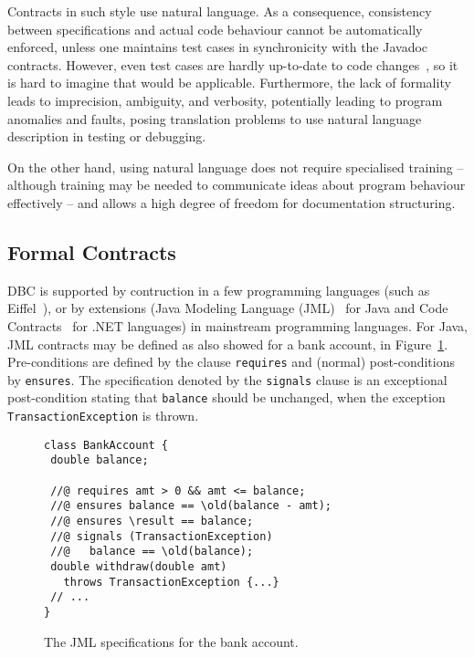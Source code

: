 Contracts in such style use natural language. As a consequence, consistency between specifications and actual code behaviour cannot be automatically enforced, unless one maintains test cases in synchronicity with the Javadoc contracts. However, even test cases are hardly up-to-date to code changes~\cite{Hao2013}, so it is hard to imagine that would be applicable. 
Furthermore, the lack of formality leads to imprecision, ambiguity, and verbosity, potentially leading to program anomalies and faults, posing translation problems to use natural language description in testing or debugging.

On the other hand, using natural language does not require specialised training -- although training may be needed to communicate
ideas about program behaviour effectively -- and allows a high degree of freedom for documentation structuring. 


\subsection{Formal Contracts}


DBC is supported by contruction in a few programming languages (such as Eiffel~\cite{eiffel}), or by extensions (Java Modeling Language (JML)~\cite{jml} for Java and Code Contracts~\cite{codeContractsPaper} for .NET languages) in mainstream programming languages.
For Java, JML contracts may be defined as also showed for a bank account, in Figure~\ref{Fig-JML-Bank}. Pre-conditions
are defined by the clause {\lstinline!requires!} and (normal) post-conditions by {\lstinline!ensures!}. The specification
denoted by the {\lstinline!signals!} clause
is an exceptional post-condition stating that {\lstinline!balance!} should be unchanged, when the exception \texttt{TransactionExcep\-tion} is thrown.

\begin{figure}
\begin{lstlisting}[basicstyle=\footnotesize\ttfamily,name=figxpi]
class BankAccount {
 double balance;

 //@ requires amt > 0 && amt <= balance;
 //@ ensures balance == \old(balance - amt);
 //@ ensures \result == balance;
 //@ signals (TransactionException) 
 //@   balance == \old(balance);
 double withdraw(double amt) 
   throws TransactionException {...}
 // ...
}
\end{lstlisting}
\caption{The JML specifications for the bank account.}
\label{Fig-JML-Bank}
\end{figure}

